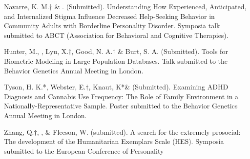 \item Navarre, K. M.$\dagger$ \& \meb. (Submitted). Understanding How Experienced, Anticipated, and Internalized Stigma Influence Decreased Help-Seeking Behavior in Community Adults with Borderline Personality Disorder. Symposia talk submitted to ABCT (Association for Behavioral and Cognitive Therapies).

\item Hunter, M., \meb, Lyu, X.$\dagger$, Good, N. A.$\dagger$ \& Burt, S. A. (Submitted). Tools for Biometric Modeling in Large Population Databases. Talk submitted to the Behavior Genetics Annual Meeting in London.

\item Tyson, H. K.*, Webster, E.$\dagger$, Knaut, K*\& \meb (Submitted). Examining ADHD Diagnosis and Cannabis Use Frequency: The Role of Family Environment in a Nationally-Representative Sample. Poster submitted to the Behavior Genetics Annual Meeting in London.


\item Zhang, Q.$\dagger$, \meb, \&  Fleeson, W. (submitted). A search for the extremely prosocial: The development of the Humanitarian Exemplars Scale (HES). Symposia submitted to the European Conference of Personality %







%

%

%
